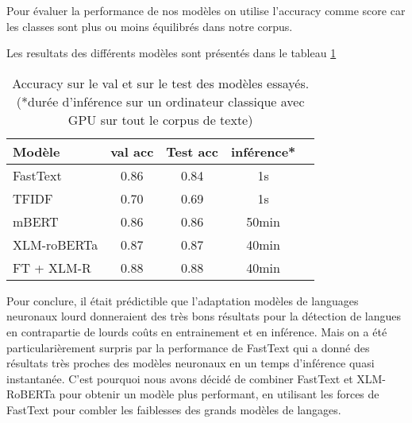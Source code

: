 
Pour évaluer la performance de nos modèles on utilise l'accuracy comme score car les classes sont plus ou moins équilibrés dans notre corpus.

Les resultats des différents modèles sont présentés dans le tableau \ref{tab:results}

\begin{table}[ht]
    \centering
    \begin{tabular}{lcccc}
        \toprule
        Modèle & val acc & Test acc  & inférence* \\
        \midrule
        FastText & 0.86 & 0.84 & 1s \\
        TFIDF & 0.70 & 0.69 & 1s \\
        mBERT & 0.86 & 0.86 & 50min \\
        XLM-roBERTa & 0.87 & 0.87 & 40min \\
        FT + XLM-R & 0.88 & 0.88 & 40min \\
        \bottomrule
    \end{tabular}

    \caption{Accuracy sur le val et sur le test des modèles essayés. (*durée d'inférence sur un ordinateur classique avec GPU sur tout le corpus de texte)}
    
    \label{tab:results}
\end{table}

Pour conclure, il était prédictible que l'adaptation modèles de languages neuronaux lourd donneraient des très bons résultats pour la détection de langues en contrapartie de lourds coûts en entrainement et en inférence. Mais on a été particularièrement surpris par la performance de FastText qui a donné des résultats très proches des modèles neuronaux en un temps d'inférence quasi instantanée. C'est pourquoi nous avons décidé de combiner FastText et XLM-RoBERTa pour obtenir un modèle plus performant, en utilisant les forces de FastText pour combler les faiblesses des grands modèles de langages.